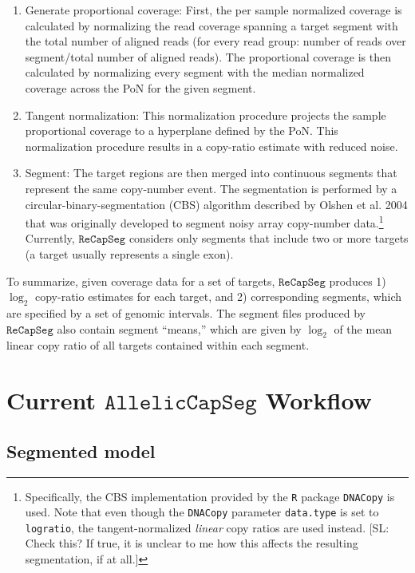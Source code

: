 \documentclass[nofootinbib,amssymb,amsmath]{revtex4}
\newcommand{\RCS}{\texttt{ReCapSeg}}
\newcommand{\ACS}{\texttt{AllelicCapSeg}}
\def\SL#1{{\color [rgb]{0,0,0.8} [SL: #1]}}
\begin{document}
\begin{enumerate}
\item
Generate proportional coverage: First, the per sample normalized coverage is calculated by normalizing the read coverage spanning a
target segment with the total number of aligned reads (for every read group: number of reads over segment/total number of aligned reads).  The proportional coverage is then calculated by normalizing every segment with the median normalized coverage across the PoN for the given segment.
\item
Tangent normalization: This normalization procedure projects the sample proportional coverage to a hyperplane defined by the PoN. This normalization procedure results in a copy-ratio estimate with reduced noise.
\item
Segment: The target regions are then merged into continuous segments that represent the same copy-number event. The segmentation is performed by a circular-binary-segmentation (CBS) algorithm described by Olshen et al. 2004 that was originally developed to segment noisy array copy-number data.\footnote{Specifically, the CBS implementation provided by the \texttt{R} package \texttt{DNACopy} is used. Note that even though the \texttt{DNACopy} parameter \texttt{data.type} is set to \texttt{logratio}, the tangent-normalized \emph{linear} copy ratios are used instead.  \SL{Check this?  If true, it is unclear to me how this affects the resulting segmentation, if at all.}} Currently, $\RCS$ considers only segments that include two or more targets (a target usually represents a single exon).
\end{enumerate}

To summarize, given coverage data for a set of targets, $\RCS$ produces 1) $\log_2$ copy-ratio estimates for each target, and 2) corresponding segments, which are specified by a set of genomic intervals.  The segment files produced by $\RCS$ also contain segment ``means,'' which are given by $\log_2$ of the mean linear copy ratio of all targets contained within each segment.

\section{Current $\ACS$ Workflow} \label{current-alleliccapseg-workflow}

\subsection{Segmented model} \label{segmented-model}
\end{document}
